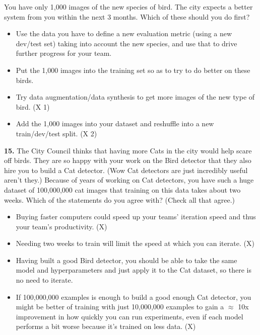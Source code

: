 You have only 1,000 images of the new species of bird. The city expects a better system from you within the next 3 months. Which of these should you do first?
\begin{itemize}
    \item Use the data you have to define a new evaluation metric (using a new dev/test set) taking into account the new species, and use that to drive further progress for your team.
    \item Put the 1,000 images into the training set so as to try to do better on these birds.
    \item Try data augmentation/data synthesis to get more images of the new type of bird. (X 1)
    \item Add the 1,000 images into your dataset and reshuffle into a new train/dev/test split. (X 2)
\end{itemize}
\textbf{15.} The City Council thinks that having more Cats in the city would help scare off birds. They are so happy with your work on the Bird detector that they also hire you to build a Cat detector. (Wow Cat detectors are just incredibly useful aren’t they.) Because of years of working on Cat detectors, you have such a huge dataset of 100,000,000 cat images that training on this data takes about two weeks. Which of the statements do you agree with? (Check all that agree.)
\begin{itemize}
    \item Buying faster computers could speed up your teams’ iteration speed and thus your team’s productivity. (X)
    \item Needing two weeks to train will limit the speed at which you can iterate. (X)
    \item Having built a good Bird detector, you should be able to take the same model and hyperparameters and just apply it to the Cat dataset, so there is no need to iterate.
    \item If 100,000,000 examples is enough to build a good enough Cat detector, you might be better of training with just 10,000,000 examples to gain a $\approx$ 10x improvement in how quickly you can run experiments, even if each model performs a bit worse because it’s trained on less data. (X)
\end{itemize}